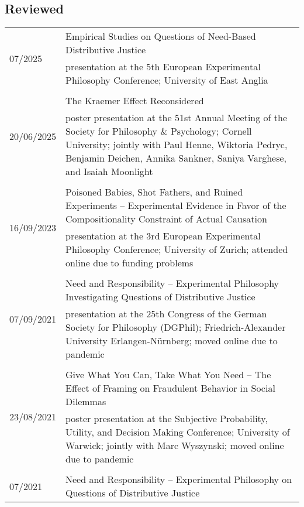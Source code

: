 \documentclass[a4paper,10pt]{article}
\begin{document}
\subsection*{Reviewed}
\begin{longtable}{p{2.25cm}p{11cm}}
\multirow{2}{2.25cm}{\footnotesize{07/2025}} & Empirical Studies on Questions of Need-Based Distributive Justice\\
& \footnotesize{presentation at the 5th European Experimental Philosophy Conference; University of East Anglia}\\
\\
\multirow{2}{2.25cm}{\footnotesize{20/06/2025}} & The Kraemer Effect Reconsidered\\
& \footnotesize{poster presentation at the 51st Annual Meeting of the Society for Philosophy \& Psychology; Cornell University; jointly with Paul Henne, Wiktoria Pedryc, Benjamin Deichen, Annika Sankner, Saniya Varghese, and Isaiah Moonlight}\\
\\
\multirow{2}{2.25cm}{\footnotesize{16/09/2023}} & Poisoned Babies, Shot Fathers, and Ruined Experiments -- Experimental Evidence in Favor of the Compositionality Constraint of Actual Causation\\
& \footnotesize{presentation at the 3rd European Experimental Philosophy Conference; University of Zurich; attended online due to funding problems}\\
\\
\multirow{2}{2.25cm}{\footnotesize{07/09/2021}} & Need and Responsibility -- Experimental Philosophy Investigating Questions of Distributive Justice\\
& \footnotesize{presentation at the 25th Congress of the German Society for Philosophy (DGPhil); Friedrich-Alexander University Erlangen-Nürnberg; moved online due to pandemic}\\
\\
\multirow{2}{2.25cm}{\footnotesize{23/08/2021}} & Give What You Can, Take What You Need -- The Effect of Framing on Fraudulent Behavior in Social Dilemmas\\
& \footnotesize{poster presentation at the Subjective Probability, Utility, and Decision Making Conference; University of Warwick; jointly with Marc Wyszynski; moved online due to pandemic}\\
\\
\multirow{2}{2.25cm}{\footnotesize{07/2021}} & Need and Responsibility -- Experimental Philosophy on Questions of Distributive Justice\\

\end{longtable}
\end{document}
